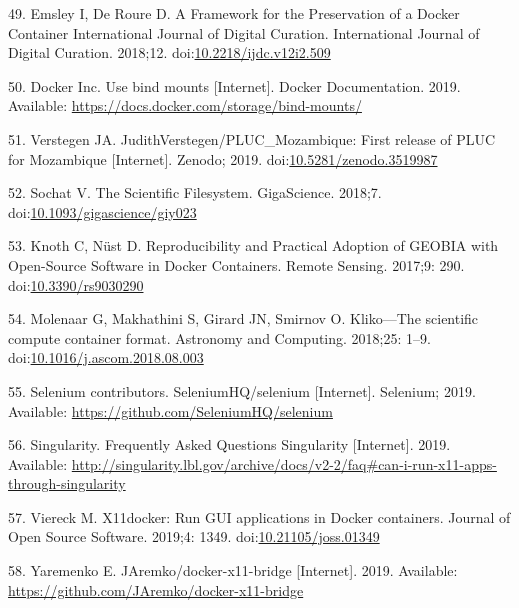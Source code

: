 \documentclass[10pt,letterpaper]{article}
\begin{document}
\leavevmode\hypertarget{ref-emsley_framework_2018}{}%
49. Emsley I, De Roure D. A Framework for the Preservation of a Docker
Container International Journal of Digital Curation. International
Journal of Digital Curation. 2018;12.
doi:\href{https://doi.org/10.2218/ijdc.v12i2.509}{10.2218/ijdc.v12i2.509}

\leavevmode\hypertarget{ref-docker_use_2019}{}%
50. Docker Inc. Use bind mounts {[}Internet{]}. Docker Documentation.
2019. Available: \url{https://docs.docker.com/storage/bind-mounts/}

\leavevmode\hypertarget{ref-verstegen_pluc_mozambique_2019}{}%
51. Verstegen JA. JudithVerstegen/PLUC\_Mozambique: First release of
PLUC for Mozambique {[}Internet{]}. Zenodo; 2019.
doi:\href{https://doi.org/10.5281/zenodo.3519987}{10.5281/zenodo.3519987}

\leavevmode\hypertarget{ref-sochat_scientific_2018}{}%
52. Sochat V. The Scientific Filesystem. GigaScience. 2018;7.
doi:\href{https://doi.org/10.1093/gigascience/giy023}{10.1093/gigascience/giy023}

\leavevmode\hypertarget{ref-knoth_reproducibility_2017}{}%
53. Knoth C, Nüst D. Reproducibility and Practical Adoption of GEOBIA
with Open-Source Software in Docker Containers. Remote Sensing. 2017;9:
290. doi:\href{https://doi.org/10.3390/rs9030290}{10.3390/rs9030290}

\leavevmode\hypertarget{ref-molenaar_klikoscientific_2018}{}%
54. Molenaar G, Makhathini S, Girard JN, Smirnov O. Kliko---The
scientific compute container format. Astronomy and Computing. 2018;25:
1--9.
doi:\href{https://doi.org/10.1016/j.ascom.2018.08.003}{10.1016/j.ascom.2018.08.003}

\leavevmode\hypertarget{ref-selenium_2019}{}%
55. Selenium contributors. SeleniumHQ/selenium {[}Internet{]}. Selenium;
2019. Available: \url{https://github.com/SeleniumHQ/selenium}

\leavevmode\hypertarget{ref-singularity_frequently_2019}{}%
56. Singularity. Frequently Asked Questions Singularity {[}Internet{]}.
2019. Available:
\url{http://singularity.lbl.gov/archive/docs/v2-2/faq\#can-i-run-x11-apps-through-singularity}

\leavevmode\hypertarget{ref-viereck_x11docker_2019}{}%
57. Viereck M. X11docker: Run GUI applications in Docker containers.
Journal of Open Source Software. 2019;4: 1349.
doi:\href{https://doi.org/10.21105/joss.01349}{10.21105/joss.01349}

\leavevmode\hypertarget{ref-yaremenko_docker-x11-bridge_2019}{}%
58. Yaremenko E. JAremko/docker-x11-bridge {[}Internet{]}. 2019.
Available: \url{https://github.com/JAremko/docker-x11-bridge}
\end{document}
